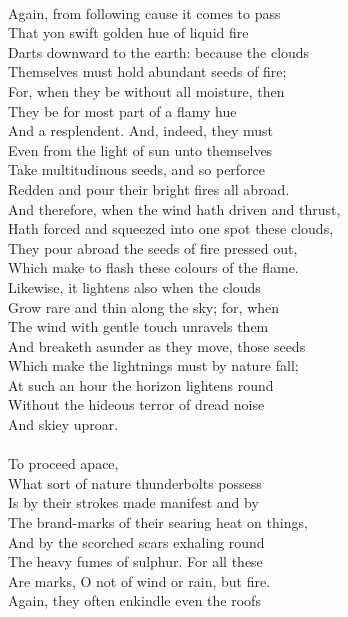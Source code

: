 \\
Again, from following cause it comes to pass\\
That yon swift golden hue of liquid fire\\
Darts downward to the earth: because the clouds\\
Themselves must hold abundant seeds of fire;\\
For, when they be without all moisture, then\\
They be for most part of a flamy hue\\
And a resplendent. And, indeed, they must\\
Even from the light of sun unto themselves\\
Take multitudinous seeds, and so perforce\\
Redden and pour their bright fires all abroad.\\
And therefore, when the wind hath driven and thrust,\\
Hath forced and squeezed into one spot these clouds,\\
They pour abroad the seeds of fire pressed out,\\
Which make to flash these colours of the flame.\\
Likewise, it lightens also when the clouds\\
Grow rare and thin along the sky; for, when\\
The wind with gentle touch unravels them\\
And breaketh asunder as they move, those seeds\\
Which make the lightnings must by nature fall;\\
At such an hour the horizon lightens round\\
Without the hideous terror of dread noise\\
And skiey uproar.\\
\\
To proceed apace,\\
What sort of nature thunderbolts possess\\
Is by their strokes made manifest and by\\
The brand-marks of their searing heat on things,\\
And by the scorched scars exhaling round\\
The heavy fumes of sulphur. For all these\\
Are marks, O not of wind or rain, but fire.\\
Again, they often enkindle even the roofs\\
